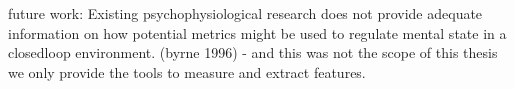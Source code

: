 

future work: Existing psychophysiological research does not provide adequate information
on how potential metrics might be used to regulate mental state in a closedloop
environment. (byrne 1996)
- and this was not the scope of this thesis we only provide the tools to measure and extract features.